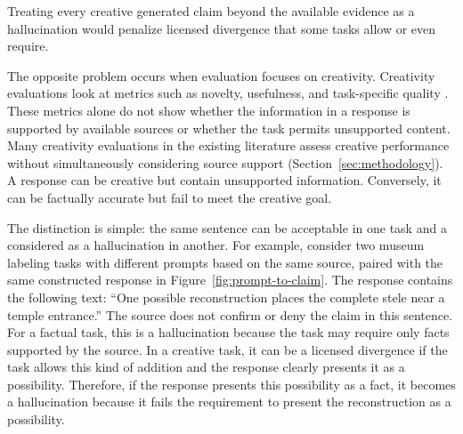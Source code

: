 \documentclass{clv2025}
\begin{document}
Treating every creative generated claim beyond the available evidence as a
hallucination would penalize licensed divergence that some tasks allow or even require.

The opposite problem occurs when evaluation focuses on creativity.
Creativity evaluations look at metrics such as novelty, usefulness, and
task-specific quality
\citep{runco_standard_2012,hou_creativityprism_2025,zhao_assessing_2025}.
These metrics alone do not show whether the information in a response is
supported by available sources or whether the task permits unsupported
content.
Many creativity evaluations in the existing literature assess creative performance without simultaneously considering source support (Section~\ref{sec:methodology}).
A response can be creative but contain unsupported
information. Conversely, it can be factually accurate but fail to meet the creative goal.


The distinction is simple: the same sentence can be acceptable in one task and
a considered as a hallucination in another. For example, consider two museum labeling tasks with different prompts based on the same
source, paired with the same constructed response in Figure~\ref{fig:prompt-to-claim}. 
The response contains the following text: ``One possible reconstruction places the complete
stele near a temple entrance.'' The source does not confirm or deny the claim in this 
sentence.
For a factual task, this is a hallucination because the task may require only
facts supported by the source. In a creative task, it can be a licensed divergence
if the task allows this kind of addition and the response clearly presents it
as a possibility.
Therefore, if the response presents this possibility as a fact, it becomes a hallucination
because it fails the requirement to present the reconstruction as a possibility.
\end{document}
